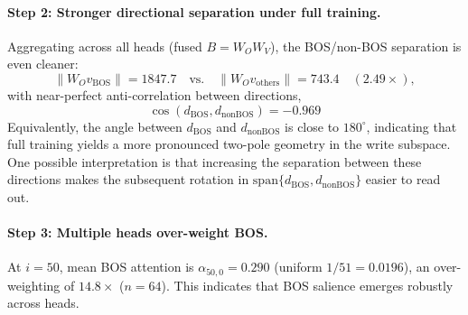 \documentclass{article}
\theoremstyle{plain}
\theoremstyle{definition}
\theoremstyle{remark}
\begin{document}
\paragraph{Step 2: Stronger directional separation under full training.}
Aggregating across all heads (fused $B=W_O W_V$), the BOS/non-BOS separation is even cleaner:
\[
\|W_O v_{\text{BOS}}\|=1847.7
\quad\text{vs.}\quad
\|W_O v_{\text{others}}\|=743.4
\quad (2.49\times),
\]
with near-perfect anti-correlation between directions,
\[
\cos(d_{\text{BOS}}, d_{\text{nonBOS}})=-0.969
\]
Equivalently, the angle between $d_{\text{BOS}}$ and $d_{\text{nonBOS}}$ is close to $180^\circ$, indicating that full training yields a more pronounced two-pole geometry in the write subspace.
One possible interpretation is that increasing the separation between these directions makes the subsequent rotation in $\mathrm{span}\{d_{\text{BOS}}, d_{\text{nonBOS}}\}$ easier to read out.

\paragraph{Step 3: Multiple heads over-weight BOS.}
At $i=50$, mean BOS attention is $\alpha_{50,0}=0.290$ (uniform $1/51=0.0196$), an over-weighting of $14.8\times$ ($n=64$).
This indicates that BOS salience emerges robustly across heads.

\begin{table}[H]
\centering
\small
\caption{\textbf{Block~2 $\text{BOS}$-bias ratio per head.}
For each head $h$, we compute the BOS-attendence metric in \cref{eq:bos_attendence_metric}
on BOS-prepended OpenWebText validation sequences, averaged over 1280 sequences.}
\label{tab:block2_bos_ratio}
\setlength{\tabcolsep}{3pt}
\vspace{-2mm}
\end{table}
\end{document}
